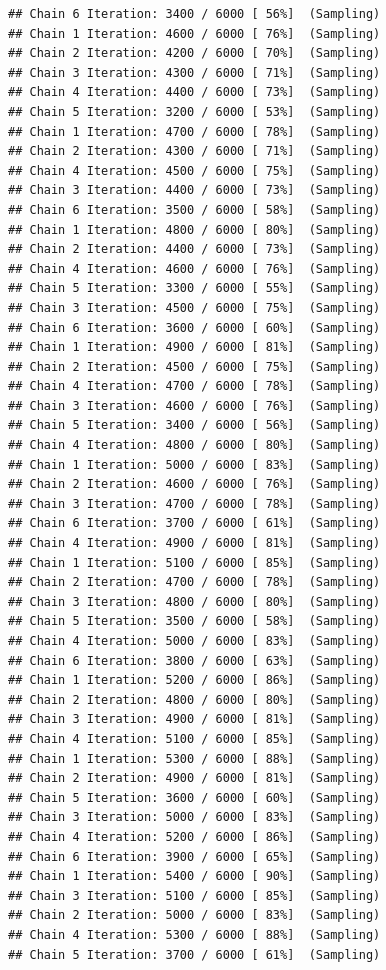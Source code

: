 \documentclass[
]{article}
\begin{document}
\begin{verbatim}
## Chain 6 Iteration: 3400 / 6000 [ 56%]  (Sampling) 
## Chain 1 Iteration: 4600 / 6000 [ 76%]  (Sampling) 
## Chain 2 Iteration: 4200 / 6000 [ 70%]  (Sampling) 
## Chain 3 Iteration: 4300 / 6000 [ 71%]  (Sampling) 
## Chain 4 Iteration: 4400 / 6000 [ 73%]  (Sampling) 
## Chain 5 Iteration: 3200 / 6000 [ 53%]  (Sampling) 
## Chain 1 Iteration: 4700 / 6000 [ 78%]  (Sampling) 
## Chain 2 Iteration: 4300 / 6000 [ 71%]  (Sampling) 
## Chain 4 Iteration: 4500 / 6000 [ 75%]  (Sampling) 
## Chain 3 Iteration: 4400 / 6000 [ 73%]  (Sampling) 
## Chain 6 Iteration: 3500 / 6000 [ 58%]  (Sampling) 
## Chain 1 Iteration: 4800 / 6000 [ 80%]  (Sampling) 
## Chain 2 Iteration: 4400 / 6000 [ 73%]  (Sampling) 
## Chain 4 Iteration: 4600 / 6000 [ 76%]  (Sampling) 
## Chain 5 Iteration: 3300 / 6000 [ 55%]  (Sampling) 
## Chain 3 Iteration: 4500 / 6000 [ 75%]  (Sampling) 
## Chain 6 Iteration: 3600 / 6000 [ 60%]  (Sampling) 
## Chain 1 Iteration: 4900 / 6000 [ 81%]  (Sampling) 
## Chain 2 Iteration: 4500 / 6000 [ 75%]  (Sampling) 
## Chain 4 Iteration: 4700 / 6000 [ 78%]  (Sampling) 
## Chain 3 Iteration: 4600 / 6000 [ 76%]  (Sampling) 
## Chain 5 Iteration: 3400 / 6000 [ 56%]  (Sampling) 
## Chain 4 Iteration: 4800 / 6000 [ 80%]  (Sampling) 
## Chain 1 Iteration: 5000 / 6000 [ 83%]  (Sampling) 
## Chain 2 Iteration: 4600 / 6000 [ 76%]  (Sampling) 
## Chain 3 Iteration: 4700 / 6000 [ 78%]  (Sampling) 
## Chain 6 Iteration: 3700 / 6000 [ 61%]  (Sampling) 
## Chain 4 Iteration: 4900 / 6000 [ 81%]  (Sampling) 
## Chain 1 Iteration: 5100 / 6000 [ 85%]  (Sampling) 
## Chain 2 Iteration: 4700 / 6000 [ 78%]  (Sampling) 
## Chain 3 Iteration: 4800 / 6000 [ 80%]  (Sampling) 
## Chain 5 Iteration: 3500 / 6000 [ 58%]  (Sampling) 
## Chain 4 Iteration: 5000 / 6000 [ 83%]  (Sampling) 
## Chain 6 Iteration: 3800 / 6000 [ 63%]  (Sampling) 
## Chain 1 Iteration: 5200 / 6000 [ 86%]  (Sampling) 
## Chain 2 Iteration: 4800 / 6000 [ 80%]  (Sampling) 
## Chain 3 Iteration: 4900 / 6000 [ 81%]  (Sampling) 
## Chain 4 Iteration: 5100 / 6000 [ 85%]  (Sampling) 
## Chain 1 Iteration: 5300 / 6000 [ 88%]  (Sampling) 
## Chain 2 Iteration: 4900 / 6000 [ 81%]  (Sampling) 
## Chain 5 Iteration: 3600 / 6000 [ 60%]  (Sampling) 
## Chain 3 Iteration: 5000 / 6000 [ 83%]  (Sampling) 
## Chain 4 Iteration: 5200 / 6000 [ 86%]  (Sampling) 
## Chain 6 Iteration: 3900 / 6000 [ 65%]  (Sampling) 
## Chain 1 Iteration: 5400 / 6000 [ 90%]  (Sampling) 
## Chain 3 Iteration: 5100 / 6000 [ 85%]  (Sampling) 
## Chain 2 Iteration: 5000 / 6000 [ 83%]  (Sampling) 
## Chain 4 Iteration: 5300 / 6000 [ 88%]  (Sampling) 
## Chain 5 Iteration: 3700 / 6000 [ 61%]  (Sampling) 

\end{verbatim}
\end{document}
